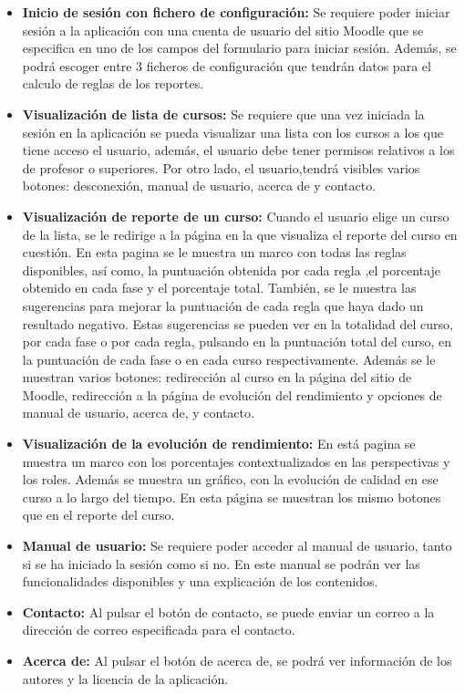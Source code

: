 \begin{itemize}
    \item \textbf{Inicio de sesión con fichero de configuración:} Se requiere poder iniciar sesión a la aplicación con una cuenta de usuario del sitio Moodle que se especifica en uno de los campos del formulario para iniciar sesión. Además, se podrá escoger entre 3 ficheros de configuración que tendrán datos para el calculo de reglas de los reportes.
    \item \textbf{Visualización de lista de cursos:} Se requiere que una vez iniciada la sesión en la aplicación se pueda visualizar una lista con los cursos a los que tiene acceso el usuario, además, el usuario debe tener permisos relativos a los de profesor o superiores. Por otro lado, el usuario,tendrá  visibles varios botones: desconexión, manual de usuario,  acerca de y contacto.
    \item \textbf{Visualización de reporte de un curso:} Cuando el usuario elige un curso de la lista, se le redirige a la página en la que visualiza el reporte del curso en cuestión. En esta pagina se le muestra un marco con todas las reglas disponibles, así como, la puntuación obtenida por cada regla ,el porcentaje obtenido en cada fase y el porcentaje total. También, se le muestra las sugerencias para mejorar la puntuación de cada regla que haya dado un resultado negativo. Estas sugerencias se pueden ver en la totalidad del curso, por cada fase o por cada regla, pulsando en la puntuación total del curso, en la puntuación de cada fase o en cada curso respectivamente. Además se le muestran varios botones: redirección al curso en la página del sitio de Moodle, redirección a la página de evolución del rendimiento y opciones de manual de usuario, acerca de, y contacto.
    \item \textbf{Visualización de la evolución de rendimiento:} En está pagina se muestra un marco con los porcentajes contextualizados en las perspectivas y los roles. Además se muestra un gráfico, con la evolución de calidad en ese curso a lo largo del tiempo. En esta página se muestran los mismo botones que en el reporte del curso.
    \item \textbf{Manual de usuario:} Se requiere poder acceder al manual de usuario, tanto si se ha iniciado la sesión como si no. En este manual se podrán ver las funcionalidades disponibles y una explicación de los contenidos.
    \item \textbf{Contacto:} Al pulsar el botón de contacto, se puede enviar un correo a la dirección de correo especificada para el contacto.
    \item \textbf{Acerca de:} Al pulsar el botón de acerca de, se podrá ver información de los autores y la licencia de la aplicación.
\end{itemize}


